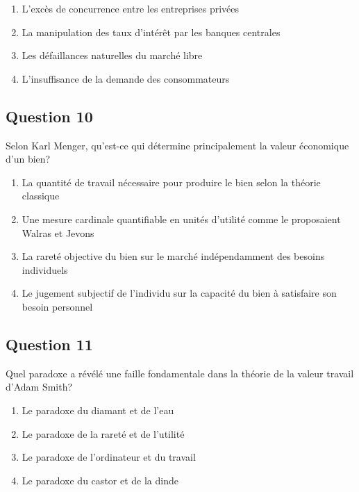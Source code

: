\documentclass[12pt,a4paper]{article}
\begin{document}
\begin{enumerate}[label=\Alph*., leftmargin=*]
\item L'excès de concurrence entre les entreprises privées
\item La manipulation des taux d'intérêt par les banques centrales
\item Les défaillances naturelles du marché libre
\item L'insuffisance de la demande des consommateurs
\end{enumerate}

\bigskip


\subsection*{Question 10}
Selon Karl Menger, qu'est-ce qui détermine principalement la valeur économique d'un bien?

\begin{enumerate}[label=\Alph*., leftmargin=*]
\item La quantité de travail nécessaire pour produire le bien selon la théorie classique
\item Une mesure cardinale quantifiable en unités d'utilité comme le proposaient Walras et Jevons
\item La rareté objective du bien sur le marché indépendamment des besoins individuels
\item Le jugement subjectif de l'individu sur la capacité du bien à satisfaire son besoin personnel
\end{enumerate}

\bigskip


\subsection*{Question 11}
Quel paradoxe a révélé une faille fondamentale dans la théorie de la valeur travail d'Adam Smith?

\begin{enumerate}[label=\Alph*., leftmargin=*]
\item Le paradoxe du diamant et de l'eau
\item Le paradoxe de la rareté et de l'utilité
\item Le paradoxe de l'ordinateur et du travail
\item Le paradoxe du castor et de la dinde
\end{enumerate}

\bigskip
\end{document}
